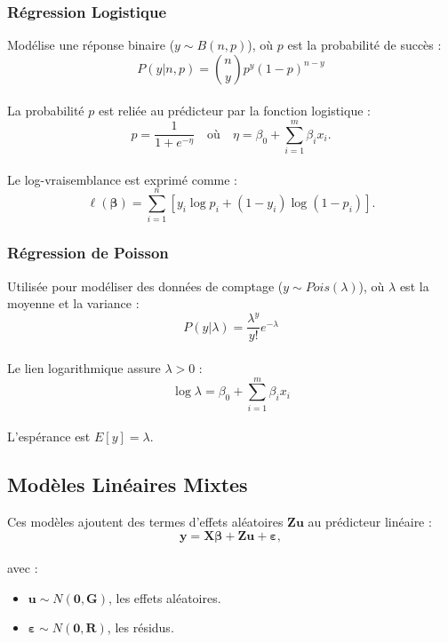 \documentclass[
]{article}
\begin{document}
\subsubsection{Régression Logistique}\label{ruxe9gression-logistique}

Modélise une réponse binaire (\(y \sim B(n, p)\)), où \(p\) est la
probabilité de succès :\\
\[ P(y | n, p) = \binom{n}{y} p^y (1-p)^{n-y} \]\\
La probabilité \(p\) est reliée au prédicteur par la fonction logistique
:\\
\[ p = \frac{1}{1 + e^{-\eta}} \quad \text{où} \quad \eta = \beta_0 + \sum_{i=1}^m \beta_i x_i. \]\\
Le log-vraisemblance est exprimé comme :\\
\[ \ell(\boldsymbol{\beta}) = \sum_{i=1}^n \left[ y_i \log{p_i} + (1-y_i) \log{(1-p_i)} \right]. \]

\subsubsection{Régression de Poisson}\label{ruxe9gression-de-poisson}

Utilisée pour modéliser des données de comptage
(\(y \sim Pois(\lambda)\)), où \(\lambda\) est la moyenne et la variance
:\\
\[ P(y | \lambda) = \frac{\lambda^y}{y!} e^{-\lambda} \]\\
Le lien logarithmique assure \(\lambda > 0\) :\\
\[ \log{\lambda} = \beta_0 + \sum_{i=1}^m \beta_i x_i \]\\
L'espérance est \(E[y] = \lambda\).

\subsection{Modèles Linéaires
Mixtes}\label{moduxe8les-linuxe9aires-mixtes}

Ces modèles ajoutent des termes d'effets aléatoires
\(\mathbf{Z} \mathbf{u}\) au prédicteur linéaire :\\
\[ \mathbf{y} = \mathbf{X} \boldsymbol{\beta} + \mathbf{Z} \mathbf{u} + \boldsymbol{\varepsilon}, \]\\
avec :

\begin{itemize}
\item
  \(\mathbf{u} \sim N(\mathbf{0}, \mathbf{G})\), les effets aléatoires.
\item
  \(\boldsymbol{\varepsilon} \sim N(\mathbf{0}, \mathbf{R})\), les
  résidus.
\end{itemize}
\end{document}
